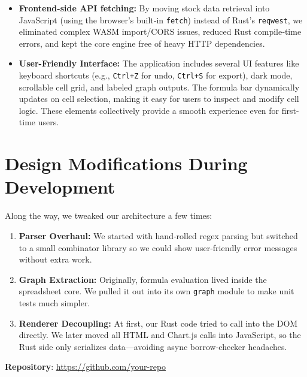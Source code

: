 \documentclass[12pt]{article}
\begin{document}
\begin{itemize}
\begin{itemize}
        \end{itemize}
        \item \textbf{Frontend-side API fetching:}
        By moving stock data retrieval into JavaScript (using the browser’s built‐in \texttt{fetch})
        instead of Rust’s \texttt{reqwest}, we eliminated complex WASM import/CORS issues, reduced Rust compile‐time errors, and kept the core engine free of heavy HTTP dependencies.
        \item \textbf{User-Friendly Interface:}
        The application includes several UI features like keyboard shortcuts (e.g., \texttt{Ctrl+Z} for undo, \texttt{Ctrl+S} for export), dark mode, scrollable cell grid, and labeled graph outputs. The formula bar dynamically updates on cell selection, making it easy for users to inspect and modify cell logic. These elements collectively provide a smooth experience even for first-time users.

    \end{itemize}

    \section{Design Modifications During Development}

    Along the way, we tweaked our architecture a few times:

    \begin{enumerate}
        \item \textbf{Parser Overhaul:}
        We started with hand‐rolled regex parsing but switched to a small combinator library so we could show user‐friendly error messages without extra work.

        \item \textbf{Graph Extraction:}
        Originally, formula evaluation lived inside the spreadsheet core.  We pulled it out into its own \texttt{graph} module to make unit tests much simpler.

        \item \textbf{Renderer Decoupling:}
        At first, our Rust code tried to call into the DOM directly.  We later moved all HTML and Chart.js calls into JavaScript, so the Rust side only serializes data—avoiding async borrow‐checker headaches.
    \end{enumerate}


    \vfill
    \noindent\textbf{Repository}: \url{https://github.com/your-repo}
\end{document}
